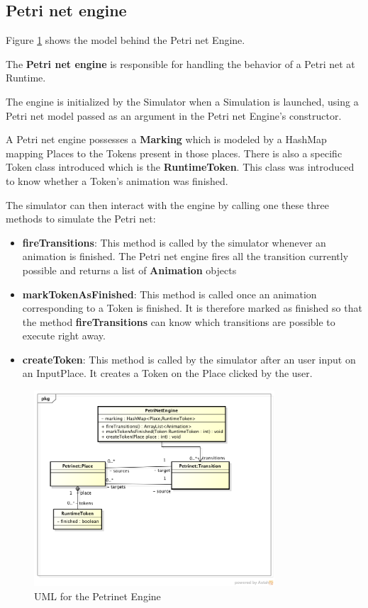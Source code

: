 \subsection{Petri net engine}

Figure \ref{fig:uml-petrinet-engine} shows the model behind the Petri net Engine.

The \textbf{Petri net engine} is responsible for handling the behavior of a Petri net at Runtime. 

The engine is initialized by the Simulator when a Simulation is launched, using a Petri net model passed as an argument in the Petri net Engine's constructor.

A Petri net engine possesses a \textbf{Marking} which is modeled by a HashMap mapping Places to the Tokens present in those places.
There is also a specific Token class introduced which is the \textbf{RuntimeToken}. This class was introduced to know whether a Token's animation was finished. 

The simulator can then interact with the engine by calling one these three methods to simulate the Petri net:

\begin{itemize}
  \item \textbf{fireTransitions}: This method is called by the simulator whenever an animation is finished. The Petri net engine fires all the transition currently possible and returns a list of \textbf{Animation} objects
  \item \textbf{markTokenAsFinished}: This method is called once an animation corresponding to a Token is finished. It is therefore marked as finished so that the method \textbf{fireTransitions} can know which transitions are possible to execute right away.
  \item \textbf{createToken}: This method is called by the simulator after an user input on an InputPlace. It creates a Token on the Place clicked by the user.
\end{itemize}
 
\begin{figure}[htp]
\begin{center}
  \includegraphics[width=0.8\textwidth]{image/petrinet_engine.png}
  \caption{UML for the Petrinet Engine}
  \label{fig:uml-petrinet-engine}
\end{center}
\end{figure}


 

